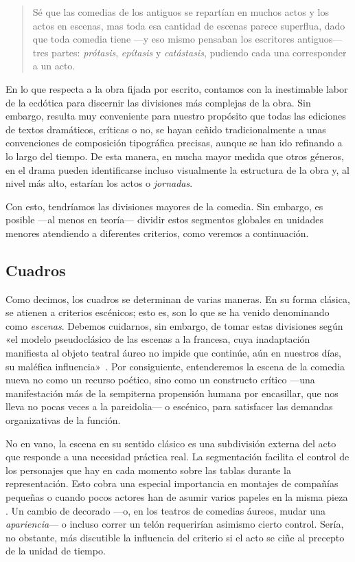 \blockquote{Sé que las comedias de los antiguos se repartían en muchos actos y los actos en escenas, mas toda esa cantidad de escenas parece superflua, dado que toda comedia tiene —\nolinebreak y eso mismo pensaban los escritores antiguos\nolinebreak— tres partes: \textit{prótasis}, \textit{epítasis} y \textit{catástasis}, pudiendo cada una corresponder a un acto. \parencite[289-290; énfasis en el original]{caramuel2011}}

En lo que respecta a la obra fijada por escrito, contamos con la inestimable labor de la ecdótica para discernir las divisiones más complejas de la obra. Sin embargo, resulta muy conveniente para nuestro propósito que todas las ediciones de textos dramáticos, críticas o no, se hayan ceñido tradicionalmente a unas convenciones de composición tipográfica precisas, aunque se han ido refinando a lo largo del tiempo. De esta manera, en mucha mayor medida que otros géneros, en el drama pueden identificarse incluso visualmente la estructura de la obra y, al nivel más alto, estarían los actos o \textit{jornadas}.

Con esto, tendríamos las divisiones mayores de la comedia. Sin embargo, es posible —\nolinebreak al menos en teoría\nolinebreak— dividir estos segmentos globales en unidades menores atendiendo a diferentes criterios, como veremos a continuación.

\subsection{Cuadros}
Como decimos, los cuadros se determinan de varias maneras. En su forma clásica, se atienen a criterios escénicos; esto es, son lo que se ha venido denominando como \textit{escenas}. Debemos cuidarnos, sin embargo, de tomar estas divisiones según «el modelo pseudoclásico de las escenas a la francesa, cuya inadaptación manifiesta al objeto teatral áureo no impide que continúe, aún en nuestros días, su maléfica influencia»~\parencite[46]{vitse1998}. Por consiguiente, entenderemos la escena de la comedia nueva no como un recurso poético, sino como un constructo crítico —\nolinebreak una manifestación más de la sempiterna propensión humana por encasillar, que nos lleva no pocas veces a la pareidolia\nolinebreak— o escénico, para satisfacer las demandas organizativas de la función.

No en vano, la escena en su sentido clásico es una subdivisión externa del acto que responde a una necesidad práctica real. La segmentación facilita el control de los personajes que hay en cada momento sobre las tablas durante la representación. Esto cobra una especial importancia en montajes de compañías pequeñas o cuando pocos actores han de asumir varios papeles en la misma pieza \parencite[170]{kayser1992}. Un cambio de decorado —o, en los teatros de comedias áureos, mudar una \textit{apariencia}— o incluso correr un telón requerirían asimismo cierto control. Sería, no obstante, más discutible la influencia del criterio si el acto se ciñe al precepto de la unidad de tiempo.

